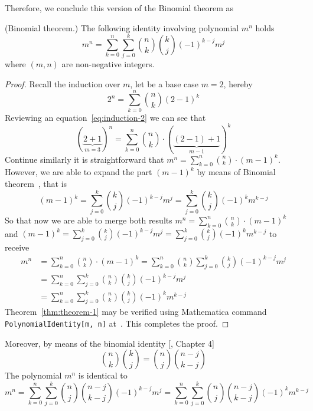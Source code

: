 Therefore, we conclude this version of the Binomial theorem as
\begin{thm} (Binomial theorem.)
    The following identity involving polynomial $m^n$ holds
    \label{thm:theorem-1}
    \begin{equation}
        m^n=\sum_{k=0}^{n}\sum_{j=0}^{k}\binom{n}{k}\binom{k}{j}(-1)^{k-j}m^j\label{eq:theorem-1}
    \end{equation}
    where $(m, n)$ are non-negative integers.
    \begin{proof}
        Recall the induction over $m$, let be a base case $m=2$, hereby
        \begin{equation}
            2^n=\sum_{k=0}^{n}\binom{n}{k}(2-1)^k\label{eq:induction-2}
        \end{equation}
        Reviewing an equation~\eqref{eq:induction-2} we can see that
        \begin{equation}
        (\underbrace{2+1}_{m=3})
            ^n=\sum_{k=0}^{n}\binom{n}{k}\cdot (\underbrace{(2-1)+1}_{m-1})^k\label{eq:induction-3}
        \end{equation}
        Continue similarly it is straightforward that $m^n = \sum_{k=0}^{n}\binom{n}{k} \cdot (m-1)^k$.
        However, we are able to expand the part $(m-1)^k$ by means of Binomial theorem~\cite{AbraSteg72}, that is
        \[
            (m-1)^k = \sum_{j=0}^{k} \binom{k}{j} (-1)^{k-j} m^j
            = \sum_{j=0}^{k} \binom{k}{j} (-1)^{k} m^{k-j}
        \]
        So that now we are able to merge both results $m^n = \sum_{k=0}^{n}\binom{n}{k} \cdot (m-1)^k$
        and $(m-1)^k = \sum_{j=0}^{k} \binom{k}{j} (-1)^{k-j} m^j = \sum_{j=0}^{k} \binom{k}{j} (-1)^{k} m^{k-j}$
        to receive
        \begin{align*}
            \label{hyp8}
            m^n
            &= \sum_{k=0}^{n} \binom{n}{k} \cdot (m-1)^k
            =\sum_{k=0}^{n} \binom{n}{k} \sum_{j=0}^{k} \binom{k}{j} (-1)^{k-j} m^j \\
            &= \sum_{k=0}^{n} \sum_{j=0}^{k} \binom{n}{k} \binom{k}{j} (-1)^{k-j} m^j \\
            &= \sum_{k=0}^{n} \sum_{j=0}^{k} \binom{n}{k} \binom{k}{j} (-1)^{k} m^{k-j}
        \end{align*}
        Theorem~\eqref{thm:theorem-1} may be verified using Mathematica command \texttt{PolynomialIdentity[m, n]}
        at~\cite{PK22Source}.
        This completes the proof.
    \end{proof}
\end{thm}
Moreover, by means of the binomial identity [\cite{gross2016combinatorial}, Chapter 4]
\[
    \binom{n}{k} \binom{k}{j} = \binom{n}{j} \binom{n-j}{k-j}
\]
The polynomial $m^n$ is identical to
\[
    m^n
    = \sum_{k=0}^{n} \sum_{j=0}^{k} \binom{n}{j} \binom{n-j}{k-j} (-1)^{k-j} m^j
    = \sum_{k=0}^{n} \sum_{j=0}^{k} \binom{n}{j} \binom{n-j}{k-j} (-1)^{k} m^{k-j}
\]